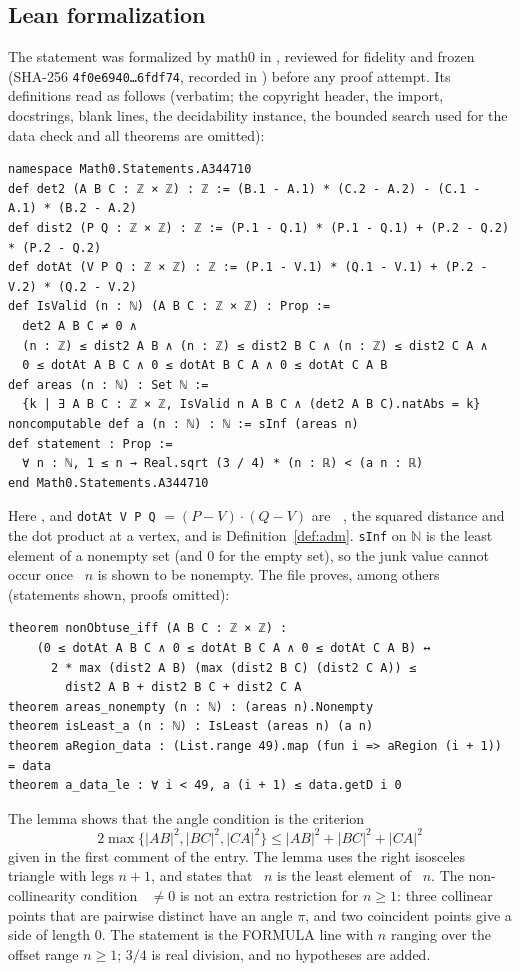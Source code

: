 \documentclass[11pt]{amsart}
\theoremstyle{plain}
\theoremstyle{definition}
\newcommand{\N}{\mathbb{N}}
\DeclareMathOperator{\dett}{det_2}
\begin{document}
\subsection*{Lean formalization}
The statement was formalized by math0 in , reviewed for fidelity and frozen (SHA-256 \texttt{4f0e6940\ldots 6fdf74}, recorded in ) before any proof attempt. Its definitions read as follows (verbatim; the copyright header, the import, docstrings, blank lines, the decidability instance, the bounded search used for the data check and all theorems are omitted):
\begin{lstlisting}
namespace Math0.Statements.A344710
def det2 (A B C : ℤ × ℤ) : ℤ := (B.1 - A.1) * (C.2 - A.2) - (C.1 - A.1) * (B.2 - A.2)
def dist2 (P Q : ℤ × ℤ) : ℤ := (P.1 - Q.1) * (P.1 - Q.1) + (P.2 - Q.2) * (P.2 - Q.2)
def dotAt (V P Q : ℤ × ℤ) : ℤ := (P.1 - V.1) * (Q.1 - V.1) + (P.2 - V.2) * (Q.2 - V.2)
def IsValid (n : ℕ) (A B C : ℤ × ℤ) : Prop :=
  det2 A B C ≠ 0 ∧
  (n : ℤ) ≤ dist2 A B ∧ (n : ℤ) ≤ dist2 B C ∧ (n : ℤ) ≤ dist2 C A ∧
  0 ≤ dotAt A B C ∧ 0 ≤ dotAt B C A ∧ 0 ≤ dotAt C A B
def areas (n : ℕ) : Set ℕ :=
  {k | ∃ A B C : ℤ × ℤ, IsValid n A B C ∧ (det2 A B C).natAbs = k}
noncomputable def a (n : ℕ) : ℕ := sInf (areas n)
def statement : Prop :=
  ∀ n : ℕ, 1 ≤ n → Real.sqrt (3 / 4) * (n : ℝ) < (a n : ℝ)
end Math0.Statements.A344710
\end{lstlisting}
Here ,  and \texttt{dotAt V P Q} $=(P-V)\cdot(Q-V)$ are $\dett$, the squared distance and the dot product at a vertex, and  is Definition~\ref{def:adm}. \texttt{sInf} on $\N$ is the least element of a nonempty set (and $0$ for the empty set), so the junk value cannot occur once ~$n$ is shown to be nonempty. The file proves, among others (statements shown, proofs omitted):
\begin{lstlisting}
theorem nonObtuse_iff (A B C : ℤ × ℤ) :
    (0 ≤ dotAt A B C ∧ 0 ≤ dotAt B C A ∧ 0 ≤ dotAt C A B) ↔
      2 * max (dist2 A B) (max (dist2 B C) (dist2 C A)) ≤
        dist2 A B + dist2 B C + dist2 C A
theorem areas_nonempty (n : ℕ) : (areas n).Nonempty
theorem isLeast_a (n : ℕ) : IsLeast (areas n) (a n)
theorem aRegion_data : (List.range 49).map (fun i => aRegion (i + 1)) = data
theorem a_data_le : ∀ i < 49, a (i + 1) ≤ data.getD i 0
\end{lstlisting}
The lemma  shows that the angle condition is the criterion
\[
  2\max\{|AB|^2,|BC|^2,|CA|^2\}\le|AB|^2+|BC|^2+|CA|^2
\]
given in the first comment of the entry. The lemma  uses the right isosceles triangle with legs $n+1$, and  states that ~$n$ is the least element of ~$n$.
The non-collinearity condition $\dett\ne0$ is not an extra restriction for $n\ge1$: three collinear points that are pairwise distinct have an angle $\pi$, and two coincident points give a side of length $0$.
The statement is the FORMULA line with $n$ ranging over the offset range $n\ge1$; $3/4$ is real division, and no hypotheses are added.
\end{document}
